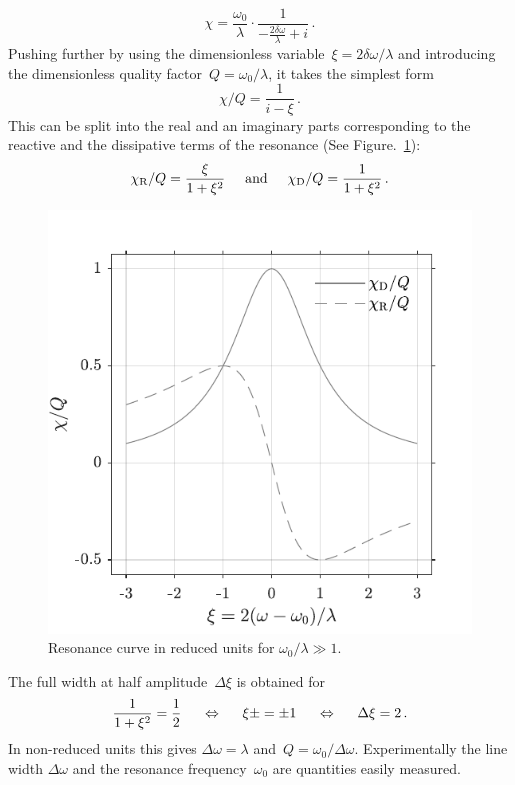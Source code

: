 \begin{equation}
	\chi = \frac{\omega_0}{\lambda}\cdot \frac{1}{ -\frac{2\delta\omega}{\lambda} + i } \,.
\end{equation}
Pushing further by using the dimensionless variable~$\xi=2\delta\omega/\lambda$ and introducing the dimensionless quality factor~$Q=\omega_0/\lambda$, it takes the simplest form
\begin{equation}
	\chi/Q = \frac{1}{i-\xi} \,.
\end{equation}
This can be split into the real and an imaginary parts corresponding to the reactive and the dissipative terms of the resonance (See Figure.~\ref{fig.ResonanceCurve}):
\begin{equation}
	\chi_{\rm R}/Q = \frac{\xi}{1+\xi^2} \hspace{0.5cm} {\rm and}
	\hspace{0.5cm} \chi_{\rm D}/Q = \frac{1}{1+\xi^2} \,.
\end{equation}
\begin{figure}[h!]
	\captionsetup{width=.8\linewidth}
	\centering
	\includegraphics[width=0.7\linewidth]{resonancecurve}
	\caption{ \small Resonance curve in reduced units for $\omega_0/\lambda \gg 1$.}
	\label{fig.ResonanceCurve}
\end{figure}

The full width at half amplitude~$\Delta \xi$ is obtained for
\begin{equation}
	\frac{1}{1+\xi^2} = \frac{1}{2} 
	\hspace{0.5cm} \Leftrightarrow \hspace{0.5cm} \xi_{}\pm = \pm 1
	\hspace{0.5cm} \Leftrightarrow \hspace{0.5cm} \Delta \xi = 2\,.
\end{equation}
In non-reduced units this gives $\Delta\omega=\lambda$ and~$Q=\omega_0/\Delta\omega$. Experimentally the line width $\Delta\omega$ and the resonance frequency~$\omega_0$ are quantities easily measured.

